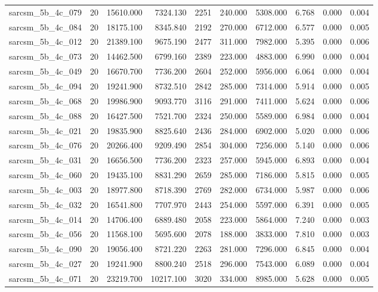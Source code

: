 \begin{tabular}{lrrrrrrrrr}
sarcsm\_5b\_4c\_079 & 20 & 15610.000 & 7324.130 & 2251 & 240.000 & 5308.000 & 6.768 & 0.000 & 0.004 \\
sarcsm\_5b\_4c\_084 & 20 & 18175.100 & 8345.840 & 2192 & 270.000 & 6712.000 & 6.577 & 0.000 & 0.005 \\
sarcsm\_5b\_4c\_012 & 20 & 21389.100 & 9675.190 & 2477 & 311.000 & 7982.000 & 5.395 & 0.000 & 0.006 \\
sarcsm\_5b\_4c\_073 & 20 & 14462.500 & 6799.160 & 2389 & 223.000 & 4883.000 & 6.990 & 0.000 & 0.004 \\
sarcsm\_5b\_4c\_049 & 20 & 16670.700 & 7736.200 & 2604 & 252.000 & 5956.000 & 6.064 & 0.000 & 0.004 \\
sarcsm\_5b\_4c\_094 & 20 & 19241.900 & 8732.510 & 2842 & 285.000 & 7314.000 & 5.914 & 0.000 & 0.005 \\
sarcsm\_5b\_4c\_068 & 20 & 19986.900 & 9093.770 & 3116 & 291.000 & 7411.000 & 5.624 & 0.000 & 0.006 \\
sarcsm\_5b\_4c\_088 & 20 & 16427.500 & 7521.700 & 2324 & 250.000 & 5589.000 & 6.984 & 0.000 & 0.004 \\
sarcsm\_5b\_4c\_021 & 20 & 19835.900 & 8825.640 & 2436 & 284.000 & 6902.000 & 5.020 & 0.000 & 0.006 \\
sarcsm\_5b\_4c\_076 & 20 & 20266.400 & 9209.490 & 2854 & 304.000 & 7256.000 & 5.140 & 0.000 & 0.006 \\
sarcsm\_5b\_4c\_031 & 20 & 16656.500 & 7736.200 & 2323 & 257.000 & 5945.000 & 6.893 & 0.000 & 0.004 \\
sarcsm\_5b\_4c\_060 & 20 & 19435.100 & 8831.290 & 2659 & 285.000 & 7186.000 & 5.815 & 0.000 & 0.005 \\
sarcsm\_5b\_4c\_003 & 20 & 18977.800 & 8718.390 & 2769 & 282.000 & 6734.000 & 5.987 & 0.000 & 0.006 \\
sarcsm\_5b\_4c\_032 & 20 & 16541.800 & 7707.970 & 2443 & 254.000 & 5597.000 & 6.391 & 0.000 & 0.005 \\
sarcsm\_5b\_4c\_014 & 20 & 14706.400 & 6889.480 & 2058 & 223.000 & 5864.000 & 7.240 & 0.000 & 0.003 \\
sarcsm\_5b\_4c\_056 & 20 & 11568.100 & 5695.600 & 2078 & 188.000 & 3833.000 & 7.810 & 0.000 & 0.003 \\
sarcsm\_5b\_4c\_090 & 20 & 19056.400 & 8721.220 & 2263 & 281.000 & 7296.000 & 6.845 & 0.000 & 0.004 \\
sarcsm\_5b\_4c\_027 & 20 & 19241.900 & 8800.240 & 2518 & 296.000 & 7543.000 & 6.089 & 0.000 & 0.004 \\
sarcsm\_5b\_4c\_071 & 20 & 23219.700 & 10217.100 & 3020 & 334.000 & 8985.000 & 5.628 & 0.000 & 0.005 \\

\end{tabular}
